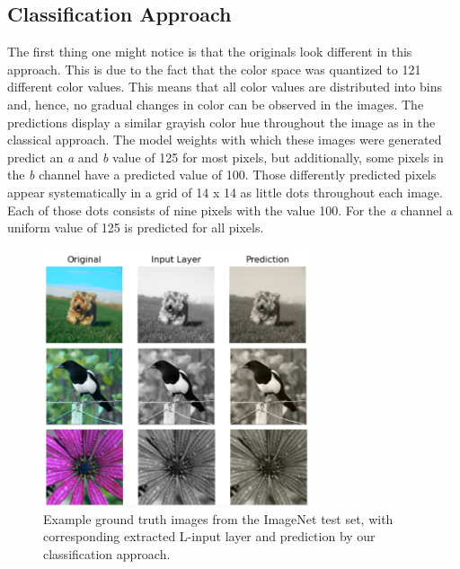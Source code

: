 \documentclass[12pt,letterpaper]{article}
\begin{document}
\newpage
\subsection{Classification Approach}
The first thing one might notice is that the originals look different in this approach. This is due to the fact that the color space was quantized to 121 different color values. This means that all color values are distributed into bins and, hence, no gradual changes in color can be observed in the images. The predictions display a similar grayish color hue throughout the image as in the classical approach. The model weights with which these images were generated predict an \emph{a} and \emph{b} value of 125 for most pixels, but additionally, some pixels in the \emph{b} channel have a predicted value of 100. Those differently predicted pixels appear systematically in a grid of 14 x 14 as little dots throughout each image. Each of those dots consists of nine pixels with the value 100. For the \emph{a} channel a uniform value of 125 is predicted for all pixels.
\begin{figure}[hbt]
	\centering
	\includegraphics[width=0.7\textwidth]{classific_predict.png}
	\caption{Example ground truth images from the ImageNet test set, with corresponding extracted L-input layer and prediction by our classification approach.}
	\label{classificatio}
\end{figure}
\newpage
\end{document}
